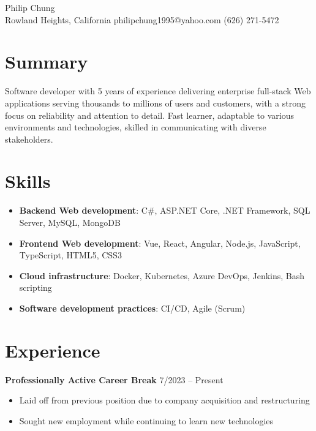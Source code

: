 \documentclass[12pt]{article}
\newcommand{\titleheader}[2]{\textbf{#1} \hfill #2}
\begin{document}
	\begin{center}
		{\headerfont\fontsize{24pt}{24pt}\selectfont Philip Chung} \\ \vspace{0.5em}
		Rowland Heights, California  philipchung1995@yahoo.com  (626) 271-5472
	\end{center}

	\section*{Summary}

	Software developer with 5 years of experience delivering enterprise full-stack Web applications serving thousands to millions of users and customers, with a strong focus on reliability and attention to detail. Fast learner, adaptable to various environments and technologies, skilled in communicating with diverse stakeholders.

	\section*{Skills}

	\newcommand{\skillitem}[2]{\item \textbf{#1}: #2}

	\begin{itemize}[left=0.25in .. 0.25in,label={},itemindent=-0.25in]
		\skillitem{Backend Web development}{C\#, ASP.NET Core, .NET Framework, SQL Server, MySQL, MongoDB}
		\skillitem{Frontend Web development}{Vue, React, Angular, Node.js, JavaScript, TypeScript, HTML5, CSS3}
		\skillitem{Cloud infrastructure}{Docker, Kubernetes, Azure DevOps, Jenkins, Bash scripting}
		\skillitem{Software development practices}{CI/CD, Agile (Scrum)}
	\end{itemize}

	\section*{Experience}

	\titleheader{Professionally Active Career Break}{7/2023 -- Present}

	\begin{itemize}
		\item Laid off from previous position due to company acquisition and restructuring
		\item Sought new employment while continuing to learn new technologies
	\end{itemize}
\end{document}
